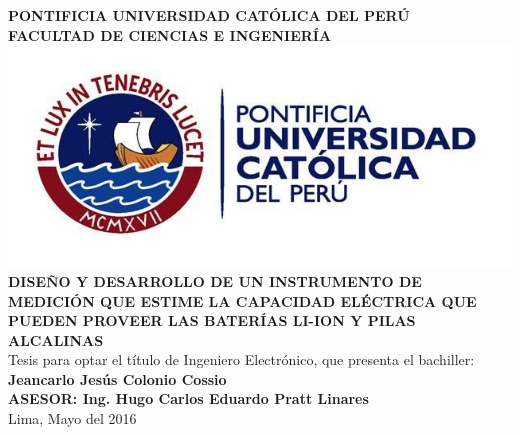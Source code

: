 \begin{center}
	\Large\textbf{PONTIFICIA UNIVERSIDAD CATÓLICA DEL PERÚ}\\
	\Large\textbf{FACULTAD DE CIENCIAS E INGENIERÍA}\\
	\includegraphics[width = 10 cm]{logopucp.jpg}\\
	\Large\textbf{DISEÑO Y DESARROLLO DE UN INSTRUMENTO DE MEDICIÓN QUE ESTIME LA CAPACIDAD ELÉCTRICA QUE PUEDEN PROVEER LAS BATERÍAS LI-ION Y PILAS ALCALINAS} \\
	\normalsize{Tesis para optar el título de Ingeniero Electrónico, que presenta el bachiller:} \\
	\large\textbf{Jeancarlo Jesús Colonio Cossio} \\
	\textbf{ASESOR: Ing. Hugo Carlos Eduardo Pratt Linares} \\
	\vfill
	Lima, Mayo del 2016 
\end{center}
\pagebreak